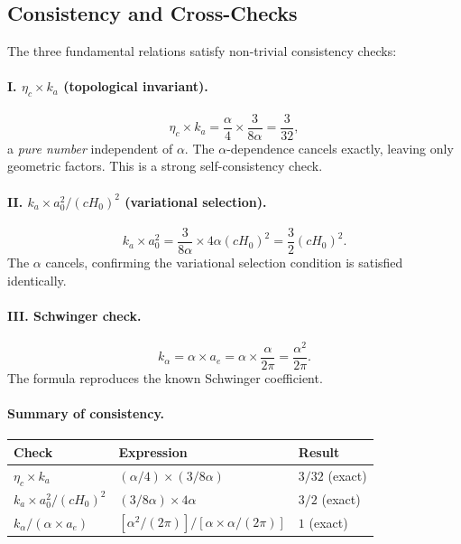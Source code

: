 \subsection{Consistency and Cross-Checks}\label{sec:alpha-consistency}

The three fundamental relations satisfy non-trivial consistency checks:

\paragraph{I. $\eta_c \times k_a$ (topological invariant).}
\begin{equation}
\eta_c \times k_a = \frac{\alpha}{4} \times \frac{3}{8\alpha} = \frac{3}{32},
\end{equation}
a \textit{pure number} independent of $\alpha$. The $\alpha$-dependence cancels exactly, leaving only geometric factors. This is a strong self-consistency check.

\paragraph{II. $k_a \times a_0^2 / (cH_0)^2$ (variational selection).}
\begin{equation}
k_a \times a_0^2 = \frac{3}{8\alpha} \times 4\alpha(cH_0)^2 = \frac{3}{2}(cH_0)^2.
\end{equation}
The $\alpha$ cancels, confirming the variational selection condition is satisfied identically.

\paragraph{III. Schwinger check.}
\begin{equation}
k_\alpha = \alpha \times a_e = \alpha \times \frac{\alpha}{2\pi} = \frac{\alpha^2}{2\pi}.
\end{equation}
The formula reproduces the known Schwinger coefficient.

\paragraph{Summary of consistency.}
\begin{center}
\renewcommand{\arraystretch}{1.2}
\begin{tabular}{lll}
\toprule
Check & Expression & Result \\
\midrule
$\eta_c \times k_a$ & $(\alpha/4) \times (3/8\alpha)$ & $3/32$ (exact) \\
$k_a \times a_0^2 / (cH_0)^2$ & $(3/8\alpha) \times 4\alpha$ & $3/2$ (exact) \\
$k_\alpha / (\alpha \times a_e)$ & $[\alpha^2/(2\pi)] / [\alpha \times \alpha/(2\pi)]$ & $1$ (exact) \\
\bottomrule
\end{tabular}
\end{center}

